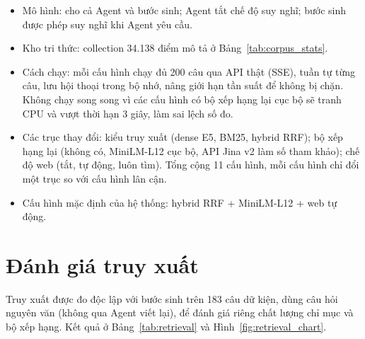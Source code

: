 \begin{itemize}
    \item Mô hình:  cho cả Agent và bước sinh; Agent tắt chế độ suy nghĩ; bước sinh được phép suy nghĩ khi Agent yêu cầu.
    \item Kho tri thức: collection 34.138 điểm mô tả ở Bảng~\ref{tab:corpus_stats}.
    \item Cách chạy: mỗi cấu hình chạy đủ 200 câu qua API thật (SSE), tuần tự từng câu, lưu hội thoại trong bộ nhớ, nâng giới hạn tần suất để không bị chặn. Không chạy song song vì các cấu hình có bộ xếp hạng lại cục bộ sẽ tranh CPU và vượt thời hạn 3 giây, làm sai lệch số đo.
    \item Các trục thay đổi: kiểu truy xuất (dense E5, BM25, hybrid RRF); bộ xếp hạng lại (không có, MiniLM-L12 cục bộ, API Jina v2 làm số tham khảo); chế độ web (tắt, tự động, luôn tìm). Tổng cộng 11 cấu hình, mỗi cấu hình chỉ đổi một trục so với cấu hình lân cận.
    \item Cấu hình mặc định của hệ thống: hybrid RRF + MiniLM-L12 + web tự động.
\end{itemize}

\section{Đánh giá truy xuất}
\label{sec:eval_retrieval}

Truy xuất được đo độc lập với bước sinh trên 183 câu dữ kiện, dùng câu hỏi nguyên văn (không qua Agent viết lại), để đánh giá riêng chất lượng chỉ mục và bộ xếp hạng. Kết quả ở Bảng~\ref{tab:retrieval} và Hình~\ref{fig:retrieval_chart}.


